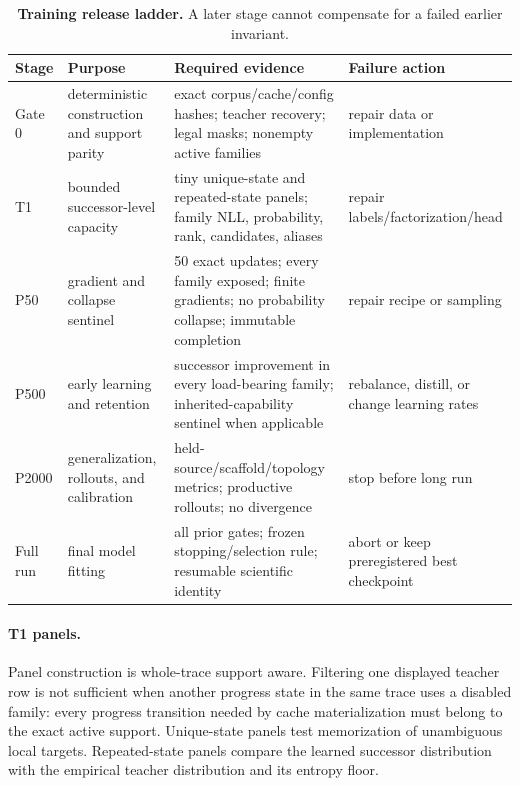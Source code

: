 \begin{table}[htbp]
  \centering
  \caption{\textbf{Training release ladder.} A later stage cannot compensate
  for a failed earlier invariant.}
  \label{tab:appendix-training-gates}
  \small
  \begin{tabularx}{\linewidth}{@{}lYYY@{}}
    \toprule
    Stage & Purpose & Required evidence & Failure action \\
    \midrule
    Gate 0 &
    deterministic construction and support parity &
    exact corpus/cache/config hashes; teacher recovery; legal masks; nonempty
    active families &
    repair data or implementation \\
    T1 &
    bounded successor-level capacity &
    tiny unique-state and repeated-state panels; family NLL, probability,
    rank, candidates, aliases &
    repair labels/factorization/head \\
    P50 &
    gradient and collapse sentinel &
    50 exact updates; every family exposed; finite gradients; no probability
    collapse; immutable completion &
    repair recipe or sampling \\
    P500 &
    early learning and retention &
    successor improvement in every load-bearing family; inherited-capability
    sentinel when applicable &
    rebalance, distill, or change learning rates \\
    P2000 &
    generalization, rollouts, and calibration &
    held-source/scaffold/topology metrics; productive rollouts; no divergence &
    stop before long run \\
    Full run &
    final model fitting &
    all prior gates; frozen stopping/selection rule; resumable scientific
    identity &
    abort or keep preregistered best checkpoint \\
    \bottomrule
  \end{tabularx}
\end{table}

\paragraph{T1 panels.}
Panel construction is whole-trace support aware.  Filtering one displayed
teacher row is not sufficient when another progress state in the same trace
uses a disabled family: every progress transition needed by cache
materialization must belong to the exact active support.  Unique-state panels
test memorization of unambiguous local targets.  Repeated-state panels compare
the learned successor distribution with the empirical teacher distribution
and its entropy floor.


